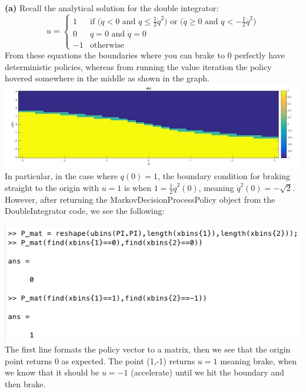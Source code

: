 \documentclass[11pt]{article}
\renewcommand{\part}[1] {\vspace{.10in} {\bf (#1)}}
\begin{document}
\part{a} Recall the analytical solution for the double integrator:
\[
    u= 
\begin{cases}
    1  & \text{if (} \dot{q} < 0 \text{ and } q\leq \frac{1}{2}\dot{q}^2 \text{) or (} \dot{q} \geq 0 \text{ and } q < -\frac{1}{2}\dot{q}^2 \text{)}  \\
    0  & q=0 \text{ and } \dot{q}=0\\
    -1 & \text{otherwise}
\end{cases}
\]
From these equations the boundaries where you can brake to 0 perfectly have deterministic policies, whereas from running the value iteration the policy hovered somewhere in the middle as shown in the graph.\\
\includegraphics[scale=.6]{dintegrate_valiter}
In particular, in the case where $q(0)=1$, the boundary condition for braking straight to the origin with $u=1$ is when $1 = \frac{1}{2}\dot{q}^2(0)$, meaning $\dot{q}^2(0)=-\sqrt{2}$. However, after returning the MarkovDecisionProcessPolicy object from the DoubleIntegrator code, we see the following:\\\\
\includegraphics[scale=.75]{doubleint_matlab}\\
The first line formats the policy vector to a matrix, then we see that the origin point returns 0 as expected. The point (1,-1) returns $u=1$ meaning brake, when we know that it should be $u=-1$ (accelerate) until we hit the boundary and then brake.
\end{document}
